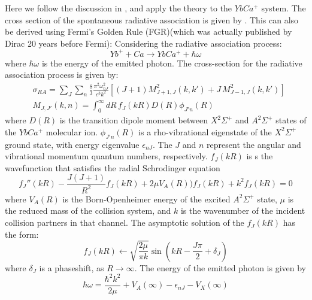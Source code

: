 Here we follow the discussion in \cite{ZL}, and apply the theory to the $YbCa^{+}$ system.
The cross section of the spontaneous radiative association is given by \cite{Zygelman1}.  This can also be derived using Fermi's Golden Rule (FGR)(which was actually published by Dirac 20 years before Fermi)\cite{FermiGR}:
Considering the radiative association process:
\begin{equation}
  Yb^+ + Ca \rightarrow YbCa^+ + \hbar\omega
\end{equation}
where $\hbar\omega $ is the energy of the emitted photon. The cross-section for the radiative association process is given by:
\begin{equation}\label{eq3}
\begin{split}
  &  \sigma_{RA} = \sum_J{\sum_n{\frac{8}{3}\frac{\pi^2\omega_{nJ}^2}{c^3k^2} \left[(J+1)M_{J+1,J}^2(k,k')+J\,M_{J-1,J}^2(k,k')\right]}} \\[.8em]
  & M_{J,J'}(k,n) = \int_{0}^{\infty}{dR\,f_J(kR)D(R)\phi_{J'n}(R) }
\end{split}
\end{equation}
where $ D(R) $ is the transition dipole moment  between $ X^2\Sigma^{+} $  and $ A^2\Sigma^{+} $ states of the $ YbCa^+  $ molecular ion. $ \phi_{J'n}(R) $ is a rho-vibrational eigenstate of the $ X^2\Sigma^{+} $ ground state, with energy eigenvalue $ \epsilon_{nJ} $. The $ J $ and $ n $ represent the angular and vibrational momentum quantum numbers, respectively. $ f_J(kR) $ is s the wavefunction that satisfies the
radial Schrodinger equation
\begin{equation}\label{eq4}
  f_{J}''(kR) - \frac{J(J+1)}{R^2}f_J(kR) + 2\mu V_{A}(R))f_{J}(kR) + k^2 f_{J}(kR) = 0
\end{equation}
where $ V_{A}(R) $ is the Born-Openheimer energy of the excited $ A^2\Sigma^{+} $ state, $ \mu $ is the reduced mass of the collision system, and $ k $ is the wavenumber of the incident collision partners in that channel.
The asymptotic solution of the $ f_J(kR) $ has the form:
\begin{equation}\label{fjRZ}
f_{J}(kR) \longleftarrow \sqrt{\frac{2\mu}{\pi k}}\sin(kR - \frac{J\pi}{2} + \delta_J)
\end{equation}
where $ \delta_J $ is a phaseshift, as $ R \rightarrow \infty $.
The energy of the emitted photon is given by
\begin{equation}
\hbar\omega = \frac{\hbar^2 k^2}{2\mu} + V_A(\infty) - \epsilon_{nJ} - V_X(\infty) 
\end{equation}

